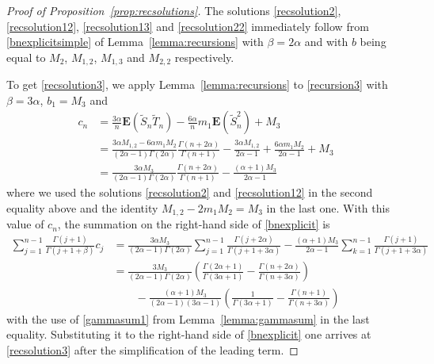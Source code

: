\documentclass[12pt,a4paper]{article}
\newcommand{\E}{\mathbf E}
\newcommand{\wt}{\widetilde}
\numberwithin{equation}{section}
\begin{document}
\begin{proof}[Proof of Proposition~\ref{prop:recsolutions}]
The solutions \eqref{recsolution2}, \eqref{recsolution12}, \eqref{recsolution13} and \eqref{recsolution22} immediately follow from \eqref{bnexplicitsimple} of Lemma~\ref{lemma:recursions} with $\beta=2\alpha$ and with $b$ being equal to $M_2$, $M_{1,2}$, $M_{1,3}$ and $M_{2,2}$ respectively.

To get \eqref{recsolution3}, we apply Lemma~\ref{lemma:recursions} to \eqref{recursion3} with $\beta=3\alpha$, $b_1=M_3$ and
\begin{equation}\label{bn3}\begin{aligned}
c_n&=\frac{3\alpha}n\E(\wt S_n\wt T_n)-\frac{6\alpha}nm_1\E(\wt S_n^2)+M_3\\
&=\frac{3\alpha M_{1,2}-6\alpha m_1M_2}{(2\alpha-1)\Gamma(2\alpha)}\frac{\Gamma(n+2\alpha)}{\Gamma(n+1)}
-\frac{3\alpha M_{1,2}}{2\alpha-1}+\frac{6\alpha m_1M_2}{2\alpha-1}+M_3\\
&=\frac{3\alpha M_3}{(2\alpha-1)\Gamma(2\alpha)}\frac{\Gamma(n+2\alpha)}{\Gamma(n+1)}-\frac{(\alpha+1)M_3}{2\alpha-1}
\end{aligned}\end{equation}
where we used the solutions \eqref{recsolution2} and \eqref{recsolution12} in the second equality above and the identity $M_{1,2}-2m_1M_2=M_3$ in the last one.
With this value of $c_n$, the summation on the right-hand side of \eqref{bnexplicit} is
\begin{equation}\begin{aligned}
\sum_{j=1}^{n-1}\frac{\Gamma(j+1)}{\Gamma(j+1+\beta)}c_j
&=\frac{3\alpha M_3}{(2\alpha-1)\Gamma(2\alpha)}\sum_{j=1}^{n-1}\frac{\Gamma(j+2\alpha)}{\Gamma(j+1+3\alpha)}
-\frac{(\alpha+1)M_3}{2\alpha-1}\sum_{k=1}^{n-1}\frac{\Gamma(j+1)}{\Gamma(j+1+3\alpha)}\\
&=\frac{3M_3}{(2\alpha-1)\Gamma(2\alpha)}\left(\frac{\Gamma(2\alpha+1)}{\Gamma(3\alpha+1)}-\frac{\Gamma(n+2\alpha)}{\Gamma(n+3\alpha)}\right)\\
&\qquad-\frac{(\alpha+1)M_3}{(2\alpha-1)(3\alpha-1)}\left(\frac1{\Gamma(3\alpha+1)}-\frac{\Gamma(n+1)}{\Gamma(n+3\alpha)}\right)
\end{aligned}\end{equation}
with the use of \eqref{gammasum1} from Lemma~\ref{lemma:gammasum} in the last equality.
Substituting it to the right-hand side of \eqref{bnexplicit} one arrives at \eqref{recsolution3} after the simplification of the leading term.


\end{proof}
\end{document}
